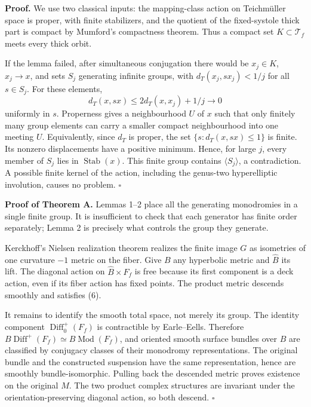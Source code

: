 \documentclass[
  11pt,
]{article}
\begin{document}
\textbf{Proof.} We use two classical inputs: the mapping-class action on
Teichmüller space is proper, with finite stabilizers, and the quotient
of the fixed-systole thick part is compact by Mumford's compactness
theorem. Thus a compact set \(K\subset\mathcal T_f\) meets every thick
orbit.

If the lemma failed, after simultaneous conjugation there would be
\(x_j\in K\), \(x_j\to x\), and sets \(S_j\) generating infinite groups,
with \(d_T(x_j,sx_j)<1/j\) for all \(s\in S_j\). For these elements, \[
              d_T(x,sx)\le2d_T(x,x_j)+1/j\longrightarrow0
\tag{9}
\] uniformly in \(s\). Properness gives a neighbourhood \(U\) of \(x\)
such that only finitely many group elements can carry a smaller compact
neighbourhood into one meeting \(U\). Equivalently, since \(d_T\) is
proper, the set \(\{s:d_T(x,sx)\le1\}\) is finite. Its nonzero
displacements have a positive minimum. Hence, for large \(j\), every
member of \(S_j\) lies in \(\operatorname{Stab}(x)\). This finite group
contains \(\langle S_j\rangle\), a contradiction. A possible finite
kernel of the action, including the genus-two hyperelliptic involution,
causes no problem. \(\square\)

\textbf{Proof of Theorem A.} Lemmas 1--2 place all the generating
monodromies in a single finite group. It is insufficient to check that
each generator has finite order separately; Lemma 2 is precisely what
controls the group they generate.

Kerckhoff's Nielsen realization theorem realizes the finite image \(G\)
as isometries of one curvature \(-1\) metric on the fiber. Give \(B\)
any hyperbolic metric and \(\widehat B\) its lift. The diagonal action
on \(\widehat B\times F_f\) is free because its first component is a
deck action, even if its fiber action has fixed points. The product
metric descends smoothly and satisfies (6).

It remains to identify the smooth total space, not merely its group. The
identity component \(\operatorname{Diff}_0^+(F_f)\) is contractible by
Earle--Eells. Therefore
\(B\operatorname{Diff}^+(F_f)\simeq B\operatorname{Mod}(F_f)\), and
oriented smooth surface bundles over \(B\) are classified by conjugacy
classes of their monodromy representations. The original bundle and the
constructed suspension have the same representation, hence are smoothly
bundle-isomorphic. Pulling back the descended metric proves existence on
the original \(M\). The two product complex structures are invariant
under the orientation-preserving diagonal action, so both descend.
\(\square\)
\end{document}

